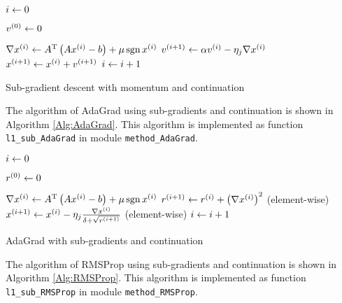 \documentclass[english]{pkupaper}
\begin{document}
\begin{thmquestion}[4]
\begin{thmanswer}
\begin{algorithm}[htbp]
$ i \leftarrow 0 $\;

$ v^{\left( 0 \right)} \leftarrow 0 $\;

{
	{
		$ \nabla x^{\left( i \right)} \leftarrow A^{\mathrm{T}} \left(  A x^{\left( i \right)} - b  \right) + \mu \operatorname{\mathrm{sgn}} x^{\left( i \right)} $\;
		$ v^{\left(  i + 1  \right)} \leftarrow \alpha v^{\left( i \right)} - \eta_j \nabla x^{\left( i \right)} $\;
		$ x^{\left(  i + 1  \right)} \leftarrow x^{\left( i \right)} + v^{\left(  i + 1  \right)} $\;
		$ i \leftarrow i + 1 $\;
	}
}

\caption{Sub-gradient descent with momentum and continuation} \label{Alg:Mmtm}
\end{algorithm}

The algorithm of AdaGrad using sub-gradients and continuation is shown in Algorithm \ref{Alg:AdaGrad}. This algorithm is implemented as function \verb"l1_sub_AdaGrad" in module \verb"method_AdaGrad".

\begin{algorithm}[htbp]
\SetAlgoLined


$ i \leftarrow 0 $\;

$ r^{\left( 0 \right)} \leftarrow 0 $\;

{
	{
		$ \nabla x^{\left( i \right)} \leftarrow A^{\mathrm{T}} \left(  A x^{\left( i \right)} - b  \right) + \mu \operatorname{\mathrm{sgn}} x^{\left( i \right)} $\;
		$ r^{\left(  i + 1  \right)} \leftarrow r^{\left( i \right)} + \left(  \nabla x^{\left( i \right)}  \right)^2 $ (element-wise)\;
		$ x^{\left(  i + 1  \right)} \leftarrow x^{\left( i \right)} - \eta_j \frac{ \nabla x^{\left( i \right)} }{ \delta + \sqrt{r^{\left(  i + 1  \right)}} } $ (element-wise)\;
		$ i \leftarrow i + 1 $\;
	}
}

\caption{AdaGrad with sub-gradients and continuation} \label{Alg:AdaGrad}
\end{algorithm}

The algorithm of RMSProp using sub-gradients and continuation is shown in Algorithm \ref{Alg:RMSProp}. This algorithm is implemented as function \verb"l1_sub_RMSProp" in module \verb"method_RMSProp".

\begin{algorithm}[htbp]
\SetAlgoLined



\end{algorithm}
\end{thmanswer}
\end{thmquestion}
\end{document}
